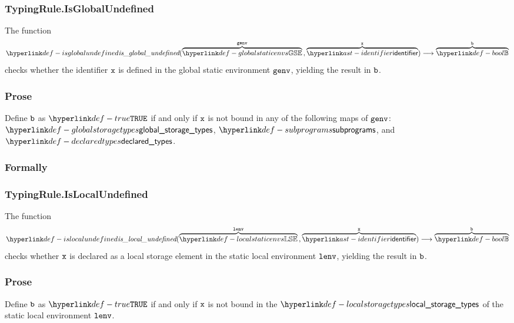 \subsubsection{TypingRule.IsGlobalUndefined\label{sec:TypingRule.IsGlobalUndefined}}
\hypertarget{def-isglobalundefined}{}
The function
\[
\isglobalundefined(\overname{\globalstaticenvs}{\genv} \aslsep \overname{\identifier}{\vx}) \aslto \overname{\Bool}{\vb}
\]
checks whether the identifier $\vx$ is defined in the global static environment $\genv$, yielding the result in $\vb$.

\subsubsection{Prose}
Define $\vb$ as $\True$ if and only if $\vx$ is not bound in any of the following maps of $\genv$:
$\globalstoragetypes$, $\subprograms$, and $\declaredtypes$.
\subsubsection{Formally}
\begin{mathpar}
\end{mathpar}

\subsubsection{TypingRule.IsLocalUndefined\label{sec:TypingRule.IsLocalUndefined}}
\hypertarget{def-islocalundefined}{}
The function
\[
\islocalundefined(\overname{\localstaticenvs}{\lenv} \aslsep \overname{\identifier}{\vx}) \aslto \overname{\Bool}{\vb}
\]
checks whether $\vx$ is declared as a local storage element in the static local environment $\lenv$, yielding the result in $\vb$.

\subsubsection{Prose}
Define $\vb$ as $\True$ if and only if $\vx$ is not bound in the $\localstoragetypes$ of the static local environment $\lenv$.
